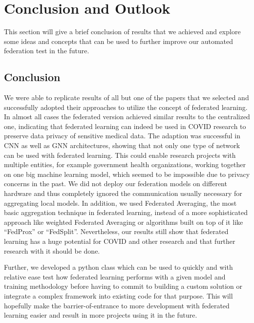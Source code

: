 \section{Conclusion and Outlook}
This section will give a brief conclusion of results that we achieved and explore some ideas and concepts that can be used to further improve our automated federation test in the future.  

\subsection{Conclusion}
We were able to replicate results of all but one of the papers that we selected and successfully adopted their approaches to utilize the concept of federated learning. In almost all cases the federated version achieved similar results to the centralized one, indicating that federated learning can indeed be used in COVID research to preserve data privacy of sensitive medical data. The adaption was successful in CNN as well as GNN architectures, showing that not only one type of network can be used with federated learning. This could enable research projects with multiple entities, for example government health organizations, working together on one big machine learning model, which seemed to be impossible due to privacy concerns in the past.
We did not deploy our federation models on different hardware and thus completely ignored the communication usually necessary for aggregating local models. In addition, we used Federated Averaging, the most basic aggregation technique in federated learning, instead of a more sophisticated approach like weighted Federated Averaging or algorithms built on top of it like \enquote{FedProx}\cite{fed_prox} or \enquote{FedSplit}\cite{fed_split}. Nevertheless, our results still show that federated learning has a huge potential for COVID and other research and that further research with it should be done.

Further, we developed a python class which can be used to quickly and with relative ease test how federated learning performs with a given model and training methodology before having to commit to building a custom solution or integrate a complex framework into existing code for that purpose. This will hopefully make the barrier-of-entrance to more development with federated learning easier and result in more projects using it in the future.


